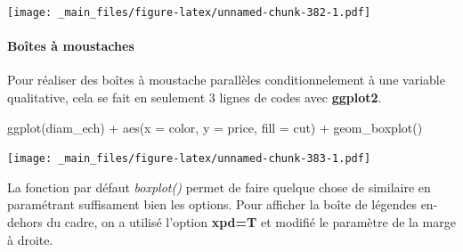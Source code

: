 \documentclass[
]{book}
\newenvironment{Shaded}{\begin{snugshade}}{\end{snugshade}}
\newcommand{\AttributeTok}[1]{\textcolor[rgb]{0.77,0.63,0.00}{#1}}
\newcommand{\FunctionTok}[1]{\textcolor[rgb]{0.00,0.00,0.00}{#1}}
\newcommand{\NormalTok}[1]{#1}
\newcommand{\SpecialCharTok}[1]{\textcolor[rgb]{0.00,0.00,0.00}{#1}}
\theoremstyle{definition}
\theoremstyle{definition}
\theoremstyle{definition}
\theoremstyle{definition}
\theoremstyle{remark}
\begin{document}
\texttt{[image: \_main\_files/figure-latex/unnamed-chunk-382-1.pdf]}

\hypertarget{bouxeetes-uxe0-moustaches}{%
\paragraph{Boîtes à moustaches}\label{bouxeetes-uxe0-moustaches}}

Pour réaliser des boîtes à moustache parallèles conditionnelement à une variable qualitative, cela se fait en seulement 3 lignes de codes avec \textbf{ggplot2}.

\begin{Shaded}
\begin{Highlighting}[]
\FunctionTok{ggplot}\NormalTok{(diam\_ech) }\SpecialCharTok{+}              
  \FunctionTok{aes}\NormalTok{(}\AttributeTok{x =}\NormalTok{ color, }\AttributeTok{y =}\NormalTok{ price, }\AttributeTok{fill =}\NormalTok{ cut) }\SpecialCharTok{+}  
  \FunctionTok{geom\_boxplot}\NormalTok{() }
\end{Highlighting}
\end{Shaded}

\texttt{[image: \_main\_files/figure-latex/unnamed-chunk-383-1.pdf]}

La fonction par défaut \emph{boxplot()} permet de faire quelque chose de similaire en paramétrant suffisament bien les options. Pour afficher la boîte de légendes en-dehors du cadre, on a utilisé l'option \textbf{xpd=T} et modifié le paramètre de la marge à droite.
\end{document}
